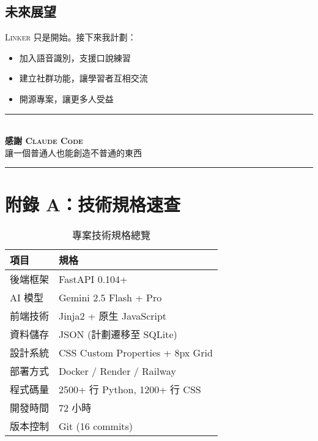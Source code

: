 \documentclass[11pt,a4paper]{article}
\newcommand{\Product}{\textsc{Linker}}
\newcommand{\Claude}{\textsc{Claude Code}}
\begin{document}
\subsection{未來展望}

\Product{} 只是開始。接下來我計劃：

\begin{itemize}
  \item 加入語音識別，支援口說練習
  \item 建立社群功能，讓學習者互相交流
  \item 開源專案，讓更多人受益
\end{itemize}

\vspace{1cm}

\begin{center}
\rule{0.5\textwidth}{0.5pt}\\[8pt]
\large
\textbf{感謝 \Claude{}}\\
\small 讓一個普通人也能創造不普通的東西\\[8pt]
\rule{0.5\textwidth}{0.5pt}
\end{center}

\newpage
\section*{附錄 A：技術規格速查}

\begin{table}[ht]
\centering
\small
\begin{tabular}{|l|l|}
\hline
\rowcolor{Brand!10}
\textbf{項目} & \textbf{規格} \\
\hline
後端框架 & FastAPI 0.104+ \\
\hline
AI 模型 & Gemini 2.5 Flash + Pro \\
\hline
前端技術 & Jinja2 + 原生 JavaScript \\
\hline
資料儲存 & JSON (計劃遷移至 SQLite) \\
\hline
設計系統 & CSS Custom Properties + 8px Grid \\
\hline
部署方式 & Docker / Render / Railway \\
\hline
程式碼量 & 2500+ 行 Python, 1200+ 行 CSS \\
\hline
開發時間 & 72 小時 \\
\hline
版本控制 & Git (16 commits) \\
\hline
\end{tabular}
\caption{專案技術規格總覽}
\end{table}
\end{document}
